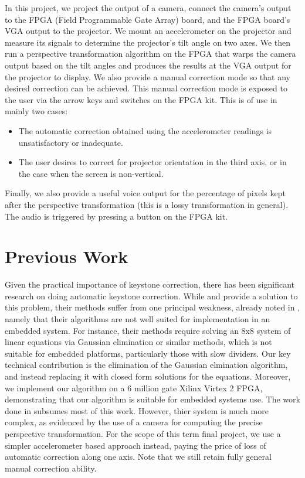 \documentclass{article}
\begin{document}
In this project, we project the output of a camera, connect the camera's output to the FPGA (Field Programmable Gate Array) board,
and the FPGA board's VGA output to the projector.
We mount an accelerometer on the projector and measure its signals to determine the projector's tilt angle on two axes.
We then run a perspective transformation algorithm on the FPGA that warps the camera output based on the tilt angles and produces the results at the VGA output for the projector to display.
We also provide a manual correction mode so that any desired correction can be achieved.
This manual correction mode is exposed to the user via the arrow keys and switches on the FPGA kit.
This is of use in mainly two cases:
\begin{itemize}
\item The automatic correction obtained using the accelerometer readings is unsatisfactory or inadequate.
\item The user desires to correct for projector orientation in the third axis, or in the case when the screen is non-vertical.
\end{itemize}
Finally, we also provide a useful voice output for the percentage of pixels kept after the perspective transformation (this is a lossy transformation in general).
The audio is triggered by pressing a button on the FPGA kit.

\section{Previous Work}
Given the practical importance of keystone correction, there has been significant research on doing automatic keystone correction.
While \citet{raskar2001self} and \citet{sukthankar2001smarter} provide a solution to this problem, their methods suffer from one principal weakness,
already noted in \citet{baoxin2004automatic}, namely that their algorithms are not well suited for implementation in an embedded system.
For instance, their methods require solving an 8x8 system of linear equations via Gaussian elimination or similar methods,
which is not suitable for embedded platforms, particularly those with slow dividers.
Our key technical contribution is the elimination of the Gaussian elmination algorithm,
and instead replacing it with closed form solutions for the equations.
Moreover, we implement our algorithm on a 6 million gate Xilinx Virtex 2 FPGA, demonstrating that our algorithm is suitable for embedded systems use.
The work done in \citet{baoxin2004automatic} subsumes most of this work.
However, thier system is much more complex, as evidenced by the use of a camera for computing the precise perspective transformation.
For the scope of this term final project,
we use a simpler accelerometer based approach instead, paying the price of loss of automatic correction along one axis.
Note that we still retain fully general manual correction ability.
\end{document}
